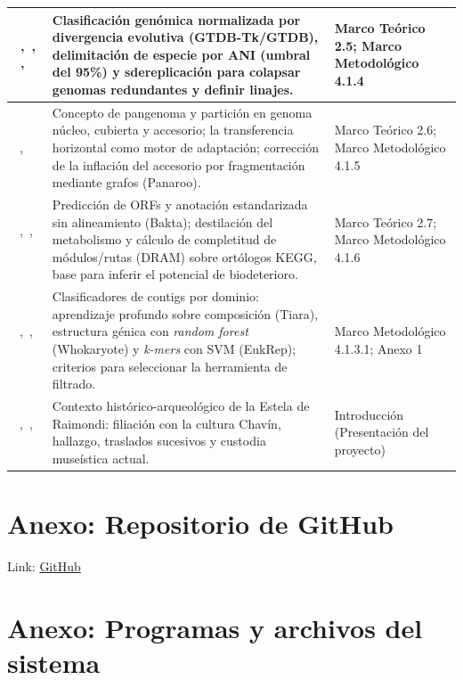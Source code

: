 \begin{xltabular}{\textwidth}{|p{1.5cm}|>{\raggedright\arraybackslash}X|>{\raggedright\arraybackslash}p{3cm}|}
\hline
~\cite{gtdbtk2019},~\cite{fastANI2018}, ~\cite{gtdb2022}, ~\cite{olm2017} & Clasificación genómica normalizada por divergencia evolutiva (GTDB-Tk/GTDB), delimitación de especie por ANI (umbral del 95\%) y sdereplicación para colapsar genomas redundantes y definir linajes. & Marco Teórico 2.5; Marco Metodológico 4.1.4 \\
\hline
~\cite{panaroo2020},~\cite{tettelin2005} & Concepto de pangenoma y partición en genoma núcleo, cubierta y accesorio; la transferencia horizontal como motor de adaptación; corrección de la inflación del accesorio por fragmentación mediante grafos (Panaroo). & Marco Teórico 2.6; Marco Metodológico 4.1.5 \\
\hline
~\cite{dram2020},~\cite{Hyatt2010}, ~\cite{schwengers2021} & Predicción de ORFs y anotación estandarizada sin alineamiento (Bakta); destilación del metabolismo y cálculo de completitud de módulos/rutas (DRAM) sobre ortólogos KEGG, base para inferir el potencial de biodeterioro. & Marco Teórico 2.7; Marco Metodológico 4.1.6 \\
\hline
~\cite{karlicki2022tiara},~\cite{pronk2022whokaryote}, ~\cite{west2018genomereconstruction} & Clasificadores de contigs por dominio: aprendizaje profundo sobre composición (Tiara), estructura génica con \textit{random forest} (Whokaryote) y \textit{k-mers} con SVM (EukRep); criterios para seleccionar la herramienta de filtrado. & Marco Metodológico 4.1.3.1; Anexo 1 \\
\hline
~\cite{cordycollins1993},~\cite{hernandez2012}, ~\cite{mnaahp2015} & Contexto histórico-arqueológico de la Estela de Raimondi: filiación con la cultura Chavín, hallazgo, traslados sucesivos y custodia museística actual. & Introducción (Presentación del proyecto) \\
\hline
\end{xltabular}
\captionsetup{list=yes}

\section{Anexo: Repositorio de GitHub}
\label{anexo:repositorio}

Link: \href{https://github.com/EduardoTllo/biodeterioro-estela-pipeline}{GitHub}


\section{Anexo: Programas y archivos del sistema}
\label{anexo:programas}


